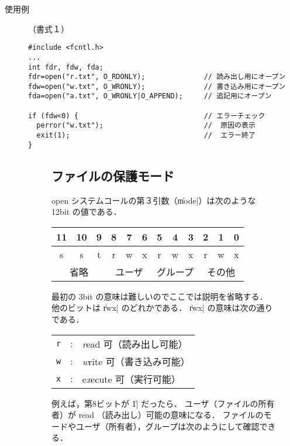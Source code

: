 \begin{description}
\item[使用例]（書式１）

\begin{lstlisting}[numbers=none]
#include <fcntl.h>
...
int fdr, fdw, fda;
fdr=open("r.txt", O_RDONLY);              // 読み出し用にオープン
fdw=open("w.txt", O_WRONLY);              // 書き込み用にオープン
fda=open("a.txt", O_WRONLY|O_APPEND);     // 追記用にオープン

if (fdw<0) {                              // エラーチェック
  perror("w.txt");                        //  原因の表示
  exit(1);                                //  エラー終了
}
\end{lstlisting}


\begin{figure}[tb]
\begin{framed}
\subsection*{ファイルの保護モード}
open システムコールの第３引数（\|mode|）は次のような 12bit の値である．

\begin{center}
{\ttfamily\small\begin{tabular}{|c|c|c||c|c|c||c|c|c||c|c|c|}
\multicolumn{1}{c}{11} &
\multicolumn{1}{c}{10} &
\multicolumn{1}{c}{ 9} &
\multicolumn{1}{c}{ 8} &
\multicolumn{1}{c}{ 7} &
\multicolumn{1}{c}{ 6} &
\multicolumn{1}{c}{ 5} &
\multicolumn{1}{c}{ 4} &
\multicolumn{1}{c}{ 3} &
\multicolumn{1}{c}{ 2} &
\multicolumn{1}{c}{ 1} &
\multicolumn{1}{c}{ 0} \\\hline
s  & s  & t & r & w & x & r & w & x & r & w & x \\\hline
\multicolumn{3}{c}{省略} &
\multicolumn{3}{c}{ユーザ} &
\multicolumn{3}{c}{グループ} &
\multicolumn{3}{c}{その他} 
\end{tabular}}
\end{center}

最初の 3bit の意味は難しいのでここでは説明を省略する．
他のビットは \|rwx| のどれかである．
\|rwx| の意味は次の通りである．

\begin{tabular}{c c l}
\texttt{r} & : & \emph{r}ead 可（読み出し可能）   \\
\texttt{w} & : & \emph{w}rite 可（書き込み可能）   \\
\texttt{x} & : & e\emph{x}ecute 可（実行可能）
\end{tabular}

例えば，第8ビットが \|1| だったら、
ユーザ（ファイルの所有者）が read （読み出し）可能の意味になる．
ファイルのモードやユーザ（所有者），グループは次のようにして確認できる．


\end{framed}
\end{figure}
\end{description}
